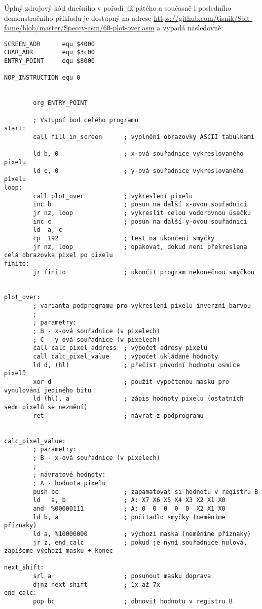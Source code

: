 \documentclass{article}
\begin{document}
Úplný zdrojový kód dnešního v pořadí již pátého a současně i posledního
demonstračního příkladu je dostupný na adrese
\url{https://github.com/tisnik/8bit-fame/blob/master/Speccy-asm/60-plot-over.asm}
a vypadá následovně:

\begin{verbatim}
SCREEN_ADR      equ $4000
CHAR_ADR        equ $3c00
ENTRY_POINT     equ $8000
 
NOP_INSTRUCTION equ 0
 
 
        org ENTRY_POINT
 
        ; Vstupní bod celého programu
start:
        call fill_in_screen      ; vyplnění obrazovky ASCII tabulkami
 
        ld b, 0                  ; x-ová souřadnice vykreslovaného pixelu
        ld c, 0                  ; y-ová souřadnice vykreslovaného pixelu
loop:
        call plot_over           ; vykreslení pixelu
        inc b                    ; posun na další x-ovou souřadnici
        jr nz, loop              ; vykreslit celou vodorovnou úsečku
        inc c                    ; posun na další y-ovou souřadnici
        ld  a, c
        cp  192                  ; test na ukončení smyčky
        jr nz, loop              ; opakovat, dokud není překreslena celá obrazovka pixel po pixelu
finito:
        jr finito                ; ukončit program nekonečnou smyčkou
 
 
plot_over:
        ; varianta podprogramu pro vykreslení pixelu inverzní barvou
        ;
        ; parametry:
        ; B - x-ová souřadnice (v pixelech)
        ; C - y-ová souřadnice (v pixelech)
        call calc_pixel_address  ; výpočet adresy pixelu
        call calc_pixel_value    ; výpočet ukládané hodnoty
        ld d, (hl)               ; přečíst původní hodnotu osmice pixelů
        xor d                    ; použít vypočtenou masku pro vynulování jediného bitu
        ld (hl), a               ; zápis hodnoty pixelu (ostatních sedm pixelů se nezmění)
        ret                      ; návrat z podprogramu
 
 
calc_pixel_value:
        ; parametry:
        ; B - x-ová souřadnice (v pixelech)
        ;
        ; návratové hodnoty:
        ; A - hodnota pixelu
        push bc                  ; zapamatovat si hodnotu v registru B
        ld   a, b                ; A: X7 X6 X5 X4 X3 X2 X1 X0 
        and  %00000111           ; A: 0  0  0  0  0  X2 X1 X0
        ld b, a                  ; počitadlo smyčky (neměníme příznaky)
        ld a, %10000000          ; výchozí maska (neměníme příznaky)
        jr z, end_calc           ; pokud je nyní souřadnice nulová, zapíšeme výchozí masku + konec
 
next_shift:
        srl a                    ; posunout masku doprava
        djnz next_shift          ; 1x až 7x
end_calc:
        pop bc                   ; obnovit hodnotu v registru B

\end{verbatim}
\end{document}
